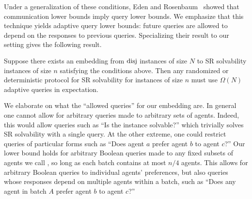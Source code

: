 Under a generalization of these conditions, Eden and Rosenbaum~\cite{Eden2018-lower} showed that communication lower bounds imply query lower bounds. We emphasize that this technique yields adaptive query lower bounds: future queries are allowed to depend on the responses to previous queries. Specializing their result to our setting gives the following result.

\begin{thm}\label{thm:communication-embedding}
    Suppose there exists an embedding from $\operatorname{disj}$ instances of size $N$ to SR solvability instances of size $n$ satisfying the conditions above. Then any randomized or deterministic protocol for SR solvability for instances of size $n$ must use $\Omega(N)$ adaptive queries in expectation.
\end{thm}

We elaborate on what the ``allowed queries'' for our embedding are. In general one cannot allow for arbitrary queries made to arbitrary sets of agents. Indeed, this would allow queries such as ``Is the instance solvable?'' which trivially solves SR solvability with a single query. At the other extreme, one could restrict queries of particular forms such as ``Does agent $a$ prefer agent $b$ to agent $c$?'' Our lower bound holds for arbitrary Boolean queries made to any fixed subsets of agents we call , so long as each batch contains at most $n/4$ agents. This allows for arbitrary Boolean queries to individual agents' preferences, but also queries whose responses depend on multiple agents within a batch, such as ``Does any agent in batch $A$ prefer agent $b$ to agent $c$?''
